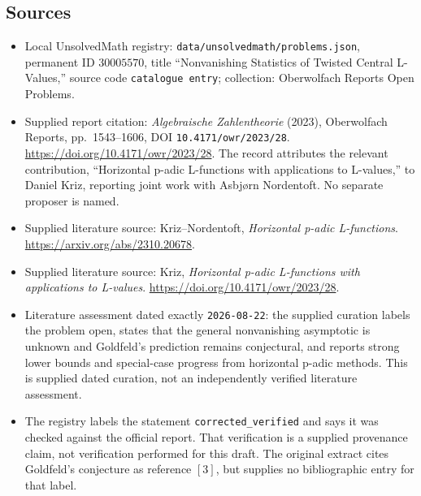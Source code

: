 \documentclass[11pt]{article}
\begin{document}
\subsection{Sources}
\begin{itemize}
\item Local UnsolvedMath registry: \texttt{data/unsolvedmath/problems.json}, permanent ID \(30005570\), title ``Nonvanishing Statistics of Twisted Central L-Values,'' source code \texttt{catalogue entry}; collection: Oberwolfach Reports Open Problems.
\item Supplied report citation: \emph{Algebraische Zahlentheorie} (2023), Oberwolfach Reports, pp.\ 1543--1606, DOI \texttt{10.4171/owr/2023/28}. \url{https://doi.org/10.4171/owr/2023/28}. The record attributes the relevant contribution, ``Horizontal p-adic L-functions with applications to L-values,'' to Daniel Kriz, reporting joint work with Asbjørn Nordentoft. No separate proposer is named.
\item Supplied literature source: Kriz--Nordentoft, \emph{Horizontal p-adic L-functions}. \url{https://arxiv.org/abs/2310.20678}.
\item Supplied literature source: Kriz, \emph{Horizontal p-adic L-functions with applications to L-values}. \url{https://doi.org/10.4171/owr/2023/28}.
\item Literature assessment dated exactly \texttt{2026-08-22}: the supplied curation labels the problem open, states that the general nonvanishing asymptotic is unknown and Goldfeld's prediction remains conjectural, and reports strong lower bounds and special-case progress from horizontal p-adic methods. This is supplied dated curation, not an independently verified literature assessment.
\item The registry labels the statement \texttt{corrected\_verified} and says it was checked against the official report. That verification is a supplied provenance claim, not verification performed for this draft. The original extract cites Goldfeld's conjecture as reference \([3]\), but supplies no bibliographic entry for that label.
\end{itemize}
\end{document}
